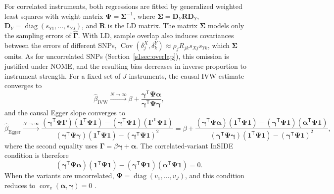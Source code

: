 \noindent For correlated instruments, both regressions are fitted by generalized weighted least squares with weight matrix $\boldsymbol{\Psi}=\boldsymbol{\Sigma}^{-1}$, where $\boldsymbol{\Sigma}=\boldsymbol D_Y\boldsymbol R\boldsymbol D_Y$, $\boldsymbol D_Y=\operatorname{diag}(s_{Y1},\ldots,s_{YJ})$, and $\boldsymbol R$ is the LD matrix. The matrix $\boldsymbol{\Sigma}$ models only the sampling errors of $\hat{\boldsymbol{\Gamma}}$. With LD, sample overlap also induces covariances between the errors of different SNPs, $\operatorname{Cov}(\delta^X_j,\delta^Y_k)\approx\rho_jR_{jk}s_{Xj}s_{Yk}$, which $\boldsymbol{\Sigma}$ omits. As for uncorrelated SNPs (Section~\ref{s1sec:overlap}), this omission is justified under NOME, and the resulting bias decreases in inverse proportion to instrument strength. For a fixed set of $J$ instruments, the causal IVW estimate converges to
\begin{equation*}
\hat{\beta}_{\text{IVW}}
\xrightarrow{N\to\infty}
\beta+\frac{\boldsymbol{\gamma}^{\mathsf T}\boldsymbol{\Psi}\boldsymbol{\alpha}}{\boldsymbol{\gamma}^{\mathsf T}\boldsymbol{\Psi}\boldsymbol{\gamma}},
\end{equation*}
and the causal Egger slope converges to
\begin{equation*}
\hat{\beta}_{\text{Egger}}
\xrightarrow{N\to\infty}
\frac{(\boldsymbol{\gamma}^{\mathsf T}\boldsymbol{\Psi}\boldsymbol{\Gamma})(\boldsymbol 1^{\mathsf T}\boldsymbol{\Psi}\boldsymbol 1)-(\boldsymbol{\gamma}^{\mathsf T}\boldsymbol{\Psi}\boldsymbol 1)(\boldsymbol{\Gamma}^{\mathsf T}\boldsymbol{\Psi}\boldsymbol 1)}
{(\boldsymbol{\gamma}^{\mathsf T}\boldsymbol{\Psi}\boldsymbol{\gamma})(\boldsymbol 1^{\mathsf T}\boldsymbol{\Psi}\boldsymbol 1)-(\boldsymbol{\gamma}^{\mathsf T}\boldsymbol{\Psi}\boldsymbol 1)^2}
=\beta+
\frac{(\boldsymbol{\gamma}^{\mathsf T}\boldsymbol{\Psi}\boldsymbol{\alpha})(\boldsymbol 1^{\mathsf T}\boldsymbol{\Psi}\boldsymbol 1)-(\boldsymbol{\gamma}^{\mathsf T}\boldsymbol{\Psi}\boldsymbol 1)(\boldsymbol{\alpha}^{\mathsf T}\boldsymbol{\Psi}\boldsymbol 1)}
{(\boldsymbol{\gamma}^{\mathsf T}\boldsymbol{\Psi}\boldsymbol{\gamma})(\boldsymbol 1^{\mathsf T}\boldsymbol{\Psi}\boldsymbol 1)-(\boldsymbol{\gamma}^{\mathsf T}\boldsymbol{\Psi}\boldsymbol 1)^2},
\end{equation*}
where the second equality uses $\boldsymbol{\Gamma}=\beta\boldsymbol{\gamma}+\boldsymbol{\alpha}$. The correlated-variant InSIDE condition is therefore
\begin{equation*}
(\boldsymbol{\gamma}^{\mathsf T}\boldsymbol{\Psi}\boldsymbol{\alpha})(\boldsymbol 1^{\mathsf T}\boldsymbol{\Psi}\boldsymbol 1)-(\boldsymbol{\gamma}^{\mathsf T}\boldsymbol{\Psi}\boldsymbol 1)(\boldsymbol{\alpha}^{\mathsf T}\boldsymbol{\Psi}\boldsymbol 1)=0.
\end{equation*}
When the variants are uncorrelated, $\boldsymbol{\Psi}=\operatorname{diag}(v_1,\ldots,v_J)$, and this condition reduces to $\operatorname{cov}_v(\boldsymbol{\alpha},\boldsymbol{\gamma})=0$ \cite{burgess2017interpreting}.

